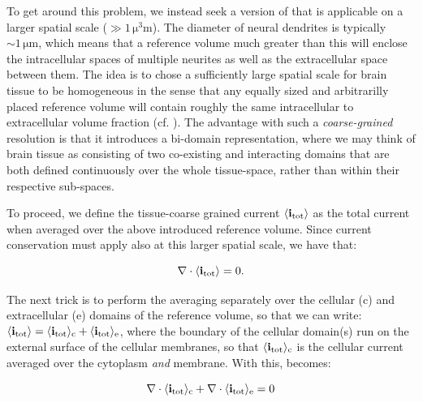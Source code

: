 To get around this problem, we instead seek a version of  
that is applicable on a larger spatial scale ($\gg 1 \, \si{\cubic\micro\metre}$). 
The diameter of neural dendrites is typically $\sim 1 \,\si{\micro\metre}$, 
which means that a reference volume much greater than this will enclose 
the intracellular spaces of multiple neurites as well as the extracellular space between them. 
The idea is to chose a sufficiently large spatial scale for brain tissue to be homogeneous 
in the sense that any equally sized and arbitrarilly placed reference volume will contain roughly 
the same intracellular to extracellular volume fraction (cf. ). 
The advantage with such a \textit{coarse-grained} resolution
is that it introduces a bi-domain representation, where we may think of brain tissue
as consisting of two co-existing and interacting domains that are both defined 
continuously over the whole tissue-space, rather than within their respective sub-spaces.

To proceed, we define the tissue-coarse grained current $\left<{\bf i}_\text{tot}\right>$ 
as the total current when averaged over the above introduced reference volume. 
Since current conservation must apply also at this larger spatial scale, we have that:

\begin{equation}
{\bf \nabla} \cdot \langle{\bf i}_\text{tot}\rangle = 0.
\label{eq:Basics:Sergey2}
\end{equation}

The next trick is to perform the averaging separately over 
the cellular (c) and extracellular (e) domains of the reference volume, so that we can write: 
$\langle{\bf i}_\text{tot}\rangle = \langle{\bf i}_\text{tot}\rangle_\text{c} + \langle{\bf i}_\text{tot}\rangle_\text{e}$, 
where the boundary of the cellular domain(s) run on the external surface of the cellular membranes,
so that $\langle{\bf i}_\text{tot}\rangle_\text{c}$ is the cellular current averaged over the cytoplasm \emph{and} membrane.
With this,  becomes: 

\begin{equation}
{\bf \nabla} \cdot \langle{\bf i}_\text{tot}\rangle_\text{c}  + {\bf \nabla}\cdot \langle{\bf i}_\text{tot}\rangle_\text{e} = 0
\label{eq:Basics:Sergey3}
\end{equation}

